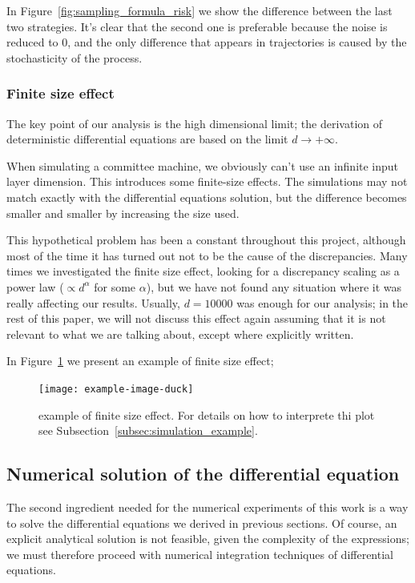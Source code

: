 In Figure~\ref{fig:sampling_formula_risk} we show the difference between the last two strategies.
It's clear that the second one is preferable because the noise is reduced to 0, and the only difference
that appears in trajectories is caused by the stochasticity of the process.

\subsubsection{Finite size effect}
The key point of our analysis is the high dimensional limit; the derivation of 
deterministic differential equations are based on the limit \(d\to+\infty\).

When simulating a committee machine, we obviously can't use an infinite input layer dimension.
This introduces some finite-size effects. The simulations may not match exactly with the 
differential equations solution, but the difference becomes smaller and smaller by 
increasing the size used. 

This hypothetical problem has been a constant throughout this project,
although most of the time it has turned out not to be the cause of the discrepancies.
Many times we investigated the finite size effect, looking for a discrepancy scaling as
a power law (\(\propto d^\alpha\) for some \(\alpha\)), but we have not found any situation where
it was really affecting our results. Usually, \(d=10000\) was enough for our analysis; 
in the rest of this paper, we will not discuss this effect again assuming that
it is not relevant to what we are talking about, except where explicitly written.

In Figure~\ref{fig:finite_size_example} we present an example of finite size effect;
\begin{figure}
  \begin{center}
    \texttt{[image: example-image-duck]}

    \caption{
      example of finite size effect. For details on how to interprete thi plot see Subsection~\ref{subsec:simulation_example}.
    }
    \label{fig:finite_size_example}
  \end{center}
\end{figure}

\subsection{Numerical solution of the differential equation}
The second ingredient needed for the numerical experiments of this work is a way to
solve the differential equations we derived in previous sections. Of course,
an explicit analytical solution is not feasible, given the complexity of the expressions;
we must therefore proceed with numerical integration techniques of differential equations. 

